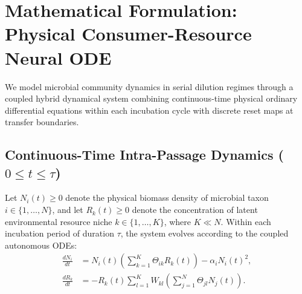 \section{Mathematical Formulation: Physical Consumer-Resource Neural ODE}
\label{sec:model}

We model microbial community dynamics in serial dilution regimes through a coupled hybrid dynamical system combining continuous-time physical ordinary differential equations within each incubation cycle with discrete reset maps at transfer boundaries.

\subsection{Continuous-Time Intra-Passage Dynamics \texorpdfstring{($0 \le t \le \tau$)}{(0 <= t <= tau)}}
Let $N_i(t) \ge 0$ denote the physical biomass density of microbial taxon $i \in \{1, \dots, N\}$, and let $R_k(t) \ge 0$ denote the concentration of latent environmental resource niche $k \in \{1, \dots, K\}$, where $K \ll N$. Within each incubation period of duration $\tau$, the system evolves according to the coupled autonomous ODEs:
\begin{align}
    \label{eq:ode_biomass}
    \frac{dN_i}{dt} &= N_i(t) \left( \sum_{k=1}^K \Theta_{ik} R_k(t) \right) - \alpha_i N_i(t)^2, \\
    \label{eq:ode_resource}
    \frac{dR_k}{dt} &= - R_k(t) \sum_{l=1}^K W_{kl} \left( \sum_{j=1}^N \Theta_{jl} N_j(t) \right).
\end{align}

